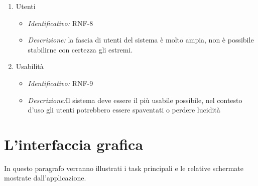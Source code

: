 \begin{enumerate}
\item Utenti
  \begin{itemize}
  \item\textit{Identificativo:} RNF-8
  \item\textit{Descrizione:} la fascia di utenti del sistema è molto ampia, non è possibile stabilirne con certezza gli estremi.
  \end{itemize}
  
  \item Usabilità
  \begin{itemize}
  \item\textit{Identificativo:} RNF-9
  \item\textit{Descrizione:}Il sistema deve essere il più usabile possibile, nel contesto d’uso gli utenti potrebbero essere spaventati o perdere lucidità
  \end{itemize}
  
\end{enumerate}

\section{L'interfaccia grafica}
In questo paragrafo verranno illustrati i task principali e le relative schermate mostrate dall'applicazione.


